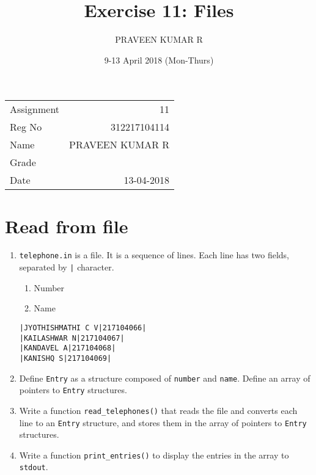 \documentclass[11pt]{article}
\author{PRAVEEN KUMAR R}
\date{9-13 April 2018 (Mon-Thurs)}
\title{Exercise 11: Files}
\begin{document}
\maketitle
\linespread{1.2}
\linespread{1.5}
\begin{center}
\begin{tabular}{lr}
Assignment & 11\\
Reg No & 312217104114\\
Name & PRAVEEN KUMAR R\\
Grade & \\
Date & 13-04-2018\\
\end{tabular}
\end{center}


\section{Read from file}
\label{sec-1}
\begin{enumerate}
\item \texttt{telephone.in} is a file.  It is a sequence of
lines. Each line has two fields, separated by \texttt{|}
character. 
\begin{enumerate}
\item Number
\item Name
\end{enumerate}
\linespread{1}
\begin{verbatim}
|JYOTHISHMATHI C V|217104066|
|KAILASHWAR N|217104067|
|KANDAVEL A|217104068|
|KANISHQ S|217104069|
\end{verbatim}
\linespread{1.5}

\item Define \texttt{Entry} as a structure composed of \texttt{number} and
\texttt{name}. Define an array of pointers to \texttt{Entry}
structures.
\item Write a function \texttt{read\_telephones()} that reads the file
and converts each line to an \texttt{Entry} structure, and
stores them in the array of pointers to \texttt{Entry}
structures.
\item Write a function \texttt{print\_entries()} to display the entries
in the array to \texttt{stdout}.
\end{enumerate}
\end{document}
